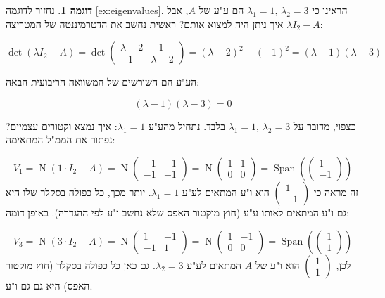 \documentclass[12pt]{report}
\theoremstyle{plain}
\theoremstyle{definition}
\newtheorem{example}{דוגמה}[chapter]
\newcommand{\0}{\mathbf{0}}
\DeclareMathOperator{\Span}{Span}
\DeclareMathOperator{\Null}{N}
\begin{document}
\begin{example}
נחזור לדוגמה 
\ref{ex:eigenvalues}.
הראינו כי
$\lambda_1=1,\,\lambda_2=3$
הם ע"ע של 
$A$,
אבל איך ניתן היה למצוא אותם? ראשית נחשב את הדטרמיננטה של המטריצה
$\lambda I_2-A$:

$$
\det(\lambda I_2-A)=\det\begin{pmatrix}
\lambda-2 & -1 \\
-1 & \lambda -2
\end{pmatrix}=(\lambda-2)^2-(-1)^2=(\lambda-1)(\lambda-3)
$$

הע"ע הם השורשים של המשוואה הריבועית הבאה:

$$
(\lambda-1)(\lambda-3)=0
$$

כצפוי, מדובר על
$\lambda_1=1,\,\lambda_2=3$
בלבד. נתחיל מהע"ע
$\lambda_1=1$:
איך נמצא וקטורים עצמיים? נפתור את הממ"ל המתאימה:

$$
V_1=\Null(1\cdot I_2-A)=\Null\begin{pmatrix}
-1 & -1 \\
-1 & -1
\end{pmatrix}=\Null\begin{pmatrix}
1 & 1 \\
0 & 0
\end{pmatrix}=\Span\left(\begin{pmatrix}1\\-1\end{pmatrix}\right)
$$
זה מראה כי 
$\begin{pmatrix}1\\-1\end{pmatrix}$
הוא ו"ע המתאים לע"ע 
$\lambda_1=1$.
יותר מכך, כל כפולה בסקלר שלו היא גם ו"ע המתאים לאותו ע"ע (חוץ מוקטור האפס שלא נחשב ו"ע לפי ההגדרה). באופן דומה:

$$
V_3=\Null(3\cdot I_2-A)=\Null\begin{pmatrix}
1 & -1 \\
-1 & 1
\end{pmatrix}=\Null\begin{pmatrix}
1 & -1 \\
0 & 0
\end{pmatrix}=\Span\left(\begin{pmatrix}1\\1\end{pmatrix}\right)
$$
לכן,
$\begin{pmatrix}1\\1\end{pmatrix}$
הוא ו"ע של 
$A$
המתאים לע"ע
$\lambda_2=3$.
גם כאן כל כפולה בסקלר (חוץ מוקטור האפס) היא גם גם ו"ע.
\end{example}
\end{document}
